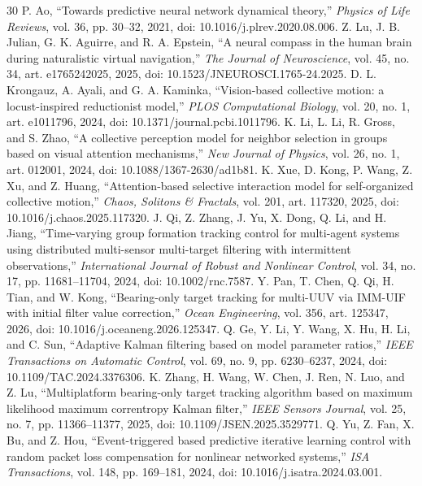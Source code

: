 \documentclass[UTF8,fontset=windows,11pt]{ctexart}
\begin{document}
\begin{thebibliography}{30}
 P. Ao, ``Towards predictive neural network dynamical theory,'' \emph{Physics of Life Reviews}, vol. 36, pp. 30--32, 2021, doi: 10.1016/j.plrev.2020.08.006.
 Z. Lu, J. B. Julian, G. K. Aguirre, and R. A. Epstein, ``A neural compass in the human brain during naturalistic virtual navigation,'' \emph{The Journal of Neuroscience}, vol. 45, no. 34, art. e1765242025, 2025, doi: 10.1523/JNEUROSCI.1765-24.2025.
 D. L. Krongauz, A. Ayali, and G. A. Kaminka, ``Vision-based collective motion: a locust-inspired reductionist model,'' \emph{PLOS Computational Biology}, vol. 20, no. 1, art. e1011796, 2024, doi: 10.1371/journal.pcbi.1011796.
 K. Li, L. Li, R. Gross, and S. Zhao, ``A collective perception model for neighbor selection in groups based on visual attention mechanisms,'' \emph{New Journal of Physics}, vol. 26, no. 1, art. 012001, 2024, doi: 10.1088/1367-2630/ad1b81.
 K. Xue, D. Kong, P. Wang, Z. Xu, and Z. Huang, ``Attention-based selective interaction model for self-organized collective motion,'' \emph{Chaos, Solitons \& Fractals}, vol. 201, art. 117320, 2025, doi: 10.1016/j.chaos.2025.117320.
 J. Qi, Z. Zhang, J. Yu, X. Dong, Q. Li, and H. Jiang, ``Time-varying group formation tracking control for multi-agent systems using distributed multi-sensor multi-target filtering with intermittent observations,'' \emph{International Journal of Robust and Nonlinear Control}, vol. 34, no. 17, pp. 11681--11704, 2024, doi: 10.1002/rnc.7587.
 Y. Pan, T. Chen, Q. Qi, H. Tian, and W. Kong, ``Bearing-only target tracking for multi-UUV via IMM-UIF with initial filter value correction,'' \emph{Ocean Engineering}, vol. 356, art. 125347, 2026, doi: 10.1016/j.oceaneng.2026.125347.
 Q. Ge, Y. Li, Y. Wang, X. Hu, H. Li, and C. Sun, ``Adaptive Kalman filtering based on model parameter ratios,'' \emph{IEEE Transactions on Automatic Control}, vol. 69, no. 9, pp. 6230--6237, 2024, doi: 10.1109/TAC.2024.3376306.
 K. Zhang, H. Wang, W. Chen, J. Ren, N. Luo, and Z. Lu, ``Multiplatform bearing-only target tracking algorithm based on maximum likelihood maximum correntropy Kalman filter,'' \emph{IEEE Sensors Journal}, vol. 25, no. 7, pp. 11366--11377, 2025, doi: 10.1109/JSEN.2025.3529771.
 Q. Yu, Z. Fan, X. Bu, and Z. Hou, ``Event-triggered based predictive iterative learning control with random packet loss compensation for nonlinear networked systems,'' \emph{ISA Transactions}, vol. 148, pp. 169--181, 2024, doi: 10.1016/j.isatra.2024.03.001.

\end{thebibliography}
\end{document}
